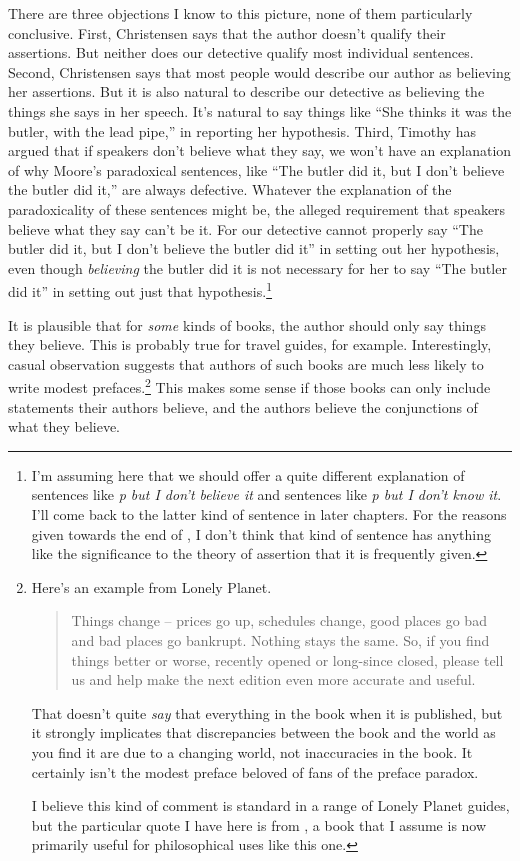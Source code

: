 There are three objections I know to this picture, none of them particularly conclusive. First, Christensen says that the author doesn't qualify their assertions. But neither does our detective qualify most individual sentences. Second, Christensen says that most people would describe our author as believing her assertions. But it is also natural to describe our detective as believing the things she says in her speech. It's natural to say things like ``She thinks it was the butler, with the lead pipe,'' in reporting her hypothesis. Third, Timothy \cite{Williamson2000-WILKAI} has argued that if speakers don't believe what they say, we won't have an explanation of why Moore's paradoxical sentences, like ``The butler did it, but I don't believe the butler did it,'' are always defective. Whatever the explanation of the paradoxicality of these sentences might be, the alleged requirement that speakers believe what they say can't be it. For our detective cannot properly say ``The butler did it, but I don't believe the butler did it'' in setting out her hypothesis, even though \textit{believing} the butler did it is not necessary for her to say ``The butler did it'' in setting out just that hypothesis.\footnote{I'm assuming here that we should offer a quite different explanation of sentences like \textit{p but I don't believe it} and sentences like \textit{p but I don't know it}. I'll come back to the latter kind of sentence in later chapters. For the reasons given towards the end of \cite{MaitraWeatherson}, I don't think that kind of sentence has anything like the significance to the theory of assertion that it is frequently given.}

It is plausible that for \textit{some} kinds of books, the author should only say things they believe. This is probably true for travel guides, for example. Interestingly, casual observation suggests that authors of such books are much less likely to write modest prefaces.\footnote{Here's an example from Lonely Planet.\begin{quote}Things change -- prices go up, schedules change, good places go bad and bad places go bankrupt. Nothing stays the same. So, if you find things better or worse, recently opened or long-since closed, please tell us and help make the next edition even more accurate and useful.\end{quote} That doesn't quite \textit{say} that everything in the book when it is published, but it strongly implicates that discrepancies between the book and the world as you find it are due to a changing world, not inaccuracies in the book. It certainly isn't the modest preface beloved of fans of the preface paradox. \par I believe this kind of comment is standard in a range of Lonely Planet guides, but the particular quote I have here is from \citet[7]{FallonYale2000}, a book that I assume is now primarily useful for philosophical uses like this one.} This makes some sense if those books can only include statements their authors believe, and the authors believe the conjunctions of what they believe.

